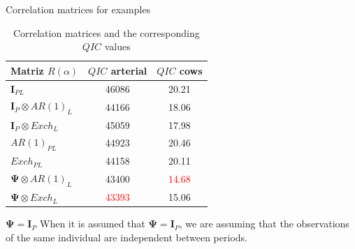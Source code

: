 \documentclass[t,9pt]{beamer}
\begin{document}
\begin{frame}[fragile]{Correlation matrices for examples}
\begin{table}[ht]
    \centering
   \captionsetup{justification=centering,margin=2cm}
   \begin{tabular}{|l|c|c|}\hline
   Matriz $R(\alpha)$ & $QIC$ arterial& $QIC$ cows\\
   \hline
   $\pmb{I}_{PL}$ & 46086& 20.21 \\
   \hline
   $\pmb{I}_{P}\otimes AR(1)_{L}$ & 44166& 18.06\\
   \hline
   $\pmb{I}_{P}\otimes Exch_{L}$ & 45059 &17.98 \\
   \hline
    $AR(1)_{PL}$ & 44923 & 20.46\\
    \hline
    $Exch_{PL}$ &  44158 & 20.11 \\
   \hline
   $\pmb{\Psi}\otimes AR(1)_{L}$ & 43400 & \textcolor{red}{14.68}  \\
   \hline
   $\pmb{\Psi}\otimes Exch_{L}$ & \textcolor{red}{43393} & 15.06\\
   \hline
    \end{tabular}
    \caption{Correlation matrices and the corresponding $QIC$ values}
    \label{tabla2}
\end{table}
\begin{block}{$\pmb{\Psi}=\pmb{I}_{P}$}
    When it is assumed that $\pmb{\Psi}=\pmb{I}_{P}$, we are assuming that the observations of the same individual are independent between periods.
\end{block}
\end{frame}
\end{document}
